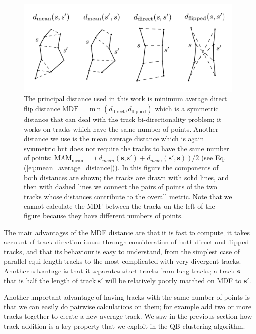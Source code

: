 \documentclass[journal]{IEEEtran}
\begin{document}
\begin{figure}
\includegraphics[scale=0.35]{Fig_2_distances2}
\centering{}
\caption{The principal distance used in this work is minimum average direct flip
distance $\textrm{MDF}=\min(d_{\textrm{direct}},d_{\textrm{flipped}})$ which is
a symmetric distance that can deal with the track bi-directionality problem; it
works on tracks which have the same number of points.  Another distance we use is the
mean average distance which is again symmetric but does not require the tracks
to have the same number of points:
$\textrm{MAM}_{\textrm{mean}}=(d_{mean}(\mathbf{s},\mathbf{s'})+d_{mean}(\mathbf{s'},\mathbf{s}))/2$ (see Eq.
(\ref{eq:mean_average_distance})).  In this figure the components of both
distances are shown; the tracks are drawn with solid lines, and then with dashed
lines we connect the pairs of points of the two tracks whose distances
contribute to the overall metric. Note that we cannot calculate the
$\textrm{MDF}$ between the tracks on the left of the figure because they have
different numbers of points.
\label{Flo:Distances_used}}
\end{figure}

The main advantages of the MDF distance are that it is fast to compute,
it takes account of track direction issues through consideration of both
direct and flipped tracks, and that its behaviour is easy to understand,
from the simplest case of parallel equi-length tracks to the most
complicated with very divergent tracks. Another advantage is that it
separates short tracks from long tracks; a track $\mathbf{s}$ that is half the
length of track $\mathbf{s'}$ will be relatively poorly matched on MDF to $\mathbf{s'}$.

Another important advantage of having tracks with the same number of points is
that we can easily do pairwise calculations on them; for example add two or more
tracks together to create a new average track. We saw in the previous section
how track addition is a key property that we exploit in the QB clustering
algorithm.
\end{document}

